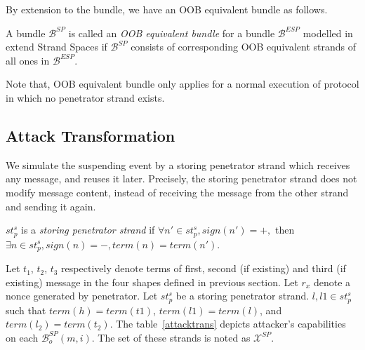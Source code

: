 By extension to the bundle, we have an OOB equivalent bundle as follows. 

\begin{Definition}\label{iopmf} A bundle $\mathcal{B}^{SP}$ is called an \emph{OOB equivalent bundle} for a bundle $\mathcal{B}^{ESP}$ modelled in extend Strand Spaces if $\mathcal{B}^{SP}$ consists of corresponding OOB equivalent strands of all ones in $\mathcal{B}^{ESP}$. 
\end{Definition}

Note that, OOB equivalent bundle only applies for a normal execution of protocol in which no penetrator strand exists. 

\subsection{Attack Transformation}\label{attacktransform}

We simulate the suspending event by a storing penetrator strand which receives any message, and reuses it later. Precisely, the storing penetrator strand does not modify message content, instead of receiving the message from the other strand and sending it again. 

\begin{Definition}
$st^s_p$ is a \emph{storing penetrator strand} if $\forall n' \in st^s_p, sign(n') = +,$ then $\exists n \in st^s_p, sign(n)= -, term(n)= term(n')$.
\end{Definition}

Let $t_1$, $t_2$, $t_3$ respectively denote terms of first, second (if existing) and third (if existing) message in the four shapes defined in previous section. Let $r_x$ denote a nonce generated by penetrator. Let $st^s_p$ be a storing penetrator strand. $l, l1\in st^s_p$ such that $term(h) = term(t1)$, $term(l1) = term(l)$, and $term(l_2) = term(t_2)$. The table~\ref{attacktrans} depicts attacker's capabilities on each $\mathcal{B}^{SP}_o(m,i)$. The set of these strands is noted as $\mathcal{X}^{SP}$.  


